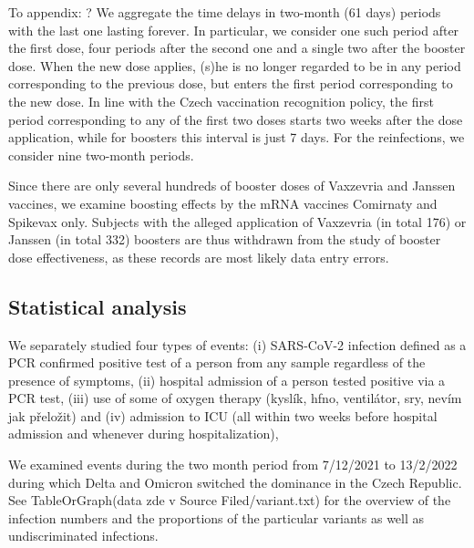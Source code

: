 \documentclass[preprint,12pt,authoryear]{elsarticle}
\begin{document}
{\color{blue} To appendix: ?
We aggregate the time delays in two-month (61 days) periods with the last one lasting forever. In particular, we consider one such period after the first dose, four periods after the second one and a single two after the booster dose. When the new dose applies, (s)he is no longer regarded to be in any period corresponding to the previous dose, but enters the first period corresponding to the new dose. In line with the Czech vaccination recognition policy, the first period corresponding to any of the first two doses starts two weeks after the dose application, while for boosters this interval is just 7 days. For the reinfections, we consider nine two-month periods.

Since there are only several hundreds of booster doses of Vaxzevria and Janssen vaccines, we examine boosting effects by the mRNA vaccines Comirnaty and Spikevax only. Subjects with the alleged application of Vaxzevria (in total 176) or Janssen (in total 332) boosters are thus withdrawn from the study of booster dose effectiveness, as these records are most likely data entry errors. }

\subsection{Statistical analysis}

We separately studied four types of events: (i) SARS-CoV-2 infection defined as a PCR confirmed positive test of a person from any sample regardless of the presence of symptoms, (ii) hospital admission of a person tested positive via a PCR test, (iii) use of some of oxygen therapy (kyslík, hfno, ventilátor, sry, nevím jak přeložit) and (iv) admission to ICU (all within two weeks before hospital admission and whenever during hospitalization),

We examined events during the two month period from 7/12/2021 to 13/2/2022 during which Delta and Omicron switched the dominance in the Czech Republic. See TableOrGraph(data zde v Source Filed/variant.txt) for the overview of the infection numbers and the proportions of the particular variants as well as undiscriminated infections. 
\end{document}
